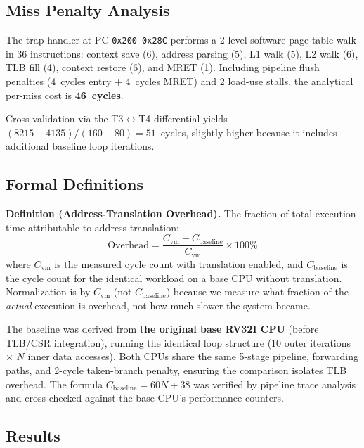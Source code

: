 \documentclass[conference]{IEEEtran}
\begin{document}
\subsection{Miss Penalty Analysis}

The trap handler at PC \texttt{0x200--0x28C} performs a 2-level software page table walk in 36 instructions: context save (6), address parsing (5), L1 walk (5), L2 walk (6), TLB fill (4), context restore (6), and MRET (1). Including pipeline flush penalties (4~cycles entry + 4~cycles MRET) and 2 load-use stalls, the analytical per-miss cost is \textbf{46~cycles}.

Cross-validation via the T3$\leftrightarrow$T4 differential yields $(8215-4135)/(160-80) = 51$~cycles, slightly higher because it includes additional baseline loop iterations.

\subsection{Formal Definitions}

\textbf{Definition (Address-Translation Overhead).} The fraction of total execution time attributable to address translation:
\begin{equation}
    \text{Overhead} = \frac{C_{\text{vm}} - C_{\text{baseline}}}{C_{\text{vm}}} \times 100\%
\end{equation}
where $C_{\text{vm}}$ is the measured cycle count with translation enabled, and $C_{\text{baseline}}$ is the cycle count for the identical workload on a base CPU without translation. Normalization is by $C_{\text{vm}}$ (not $C_{\text{baseline}}$) because we measure what fraction of the \textit{actual} execution is overhead, not how much slower the system became.

The baseline was derived from \textbf{the original base RV32I CPU} (before TLB/CSR integration), running the identical loop structure (10 outer iterations $\times$ $N$ inner data accesses). Both CPUs share the same 5-stage pipeline, forwarding paths, and 2-cycle taken-branch penalty, ensuring the comparison isolates TLB overhead. The formula $C_{\text{baseline}} = 60N + 38$ was verified by pipeline trace analysis and cross-checked against the base CPU's performance counters.

\subsection{Results}
\end{document}
